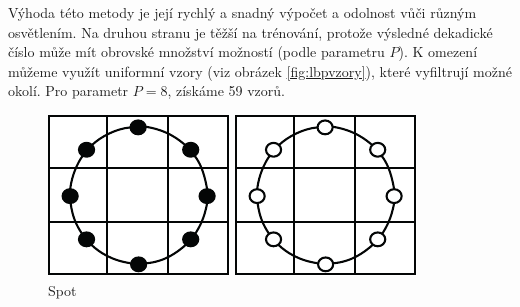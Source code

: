 Výhoda této metody je její rychlý a snadný výpočet a odolnost vůči různým osvětlením. Na druhou stranu je těžší na trénování, protože výsledné dekadické číslo může mít obrovské množství možností (podle parametru $P$). K omezení můžeme využít uniformní vzory (viz obrázek \ref{fig:lbpvzory}), které vyfiltrují možné okolí. Pro parametr $P=8$, získáme 59 vzorů. 

\begin{figure}[H]
\centering
\begin{minipage}[b]{.17\textwidth}
  \centering
  \includegraphics[width=.9\linewidth]{figures/lbp_spot}
  \caption*{Spot}
\end{minipage}
\begin{minipage}[b]{.17\textwidth}
  \centering
  \includegraphics[width=.9\linewidth]{figures/lbp_spot_flat}

\end{minipage}
\end{figure}
